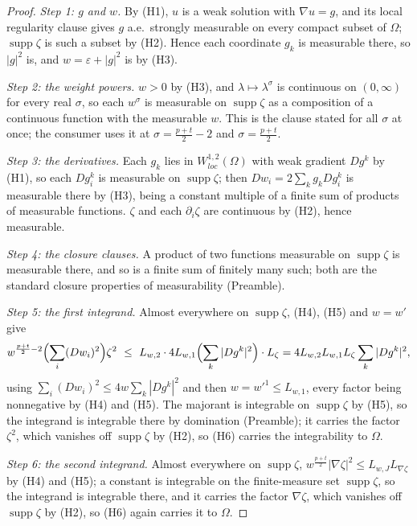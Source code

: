 \begin{proof}
\emph{Step 1: $g$ and $w$.}  By (H1), $u$ is a weak solution with $\nabla u=g$,
and its local regularity clause gives $g$ a.e.\ strongly measurable on every
compact subset of $\Omega$; $\operatorname{supp}\zeta$ is such a subset by (H2).
Hence each coordinate $g_k$ is measurable there, so $|g|^2$ is, and
$w=\varepsilon+|g|^2$ is by (H3).

\emph{Step 2: the weight powers.}  $w>0$ by (H3), and
$\lambda\mapsto\lambda^\sigma$ is continuous on $(0,\infty)$ for every real
$\sigma$, so each $w^\sigma$ is measurable on $\operatorname{supp}\zeta$ as a
composition of a continuous function with the measurable $w$.  This is the
clause stated for all $\sigma$ at once; the consumer uses it at
$\sigma=\frac{p+t}2-2$ and $\sigma=\frac{p+t}2$.

\emph{Step 3: the derivatives.}  Each $g_k$ lies in $W^{1,2}_{loc}(\Omega)$
with weak gradient $Dg^k$ by (H1), so each $Dg^k_i$ is measurable on
$\operatorname{supp}\zeta$; then $Dw_i=2\sum_kg_kDg^k_i$ is measurable there by
(H3), being a constant multiple of a finite sum of products of measurable
functions.  $\zeta$ and each $\partial_i\zeta$ are continuous by (H2), hence
measurable.

\emph{Step 4: the closure clauses.}  A product of two functions measurable on
$\operatorname{supp}\zeta$ is measurable there, and so is a finite sum of
finitely many such; both are the standard closure properties of measurability
(Preamble).

\emph{Step 5: the first integrand.}  Almost everywhere on
$\operatorname{supp}\zeta$, (H4), (H5) and $w=w'$ give
\[
w^{\frac{p+t}2-2}\Bigl(\sum_i(Dw_i)^2\Bigr)\zeta^2
\ \le\ L_{w,2}\cdot4L_{w,1}\Bigl(\sum_k|Dg^k|^2\Bigr)\cdot L_\zeta
=4L_{w,2}L_{w,1}L_\zeta\sum_k|Dg^k|^2,
\]
using $\sum_i(Dw_i)^2\le4w\sum_k|Dg^k|^2$ and then $w=w'^1\le L_{w,1}$, every
factor being nonnegative by (H4) and (H5).  The majorant is integrable on
$\operatorname{supp}\zeta$ by (H5), so the integrand is integrable there by
domination (Preamble); it carries the factor $\zeta^2$, which vanishes off
$\operatorname{supp}\zeta$ by (H2), so (H6) carries the integrability to
$\Omega$.

\emph{Step 6: the second integrand.}  Almost everywhere on
$\operatorname{supp}\zeta$, $w^{\frac{p+t}2}|\nabla\zeta|^2\le L_{w,J}L_{\nabla\zeta}$
by (H4) and (H5); a constant is integrable on the finite-measure set
$\operatorname{supp}\zeta$, so the integrand is integrable there, and it carries
the factor $\nabla\zeta$, which vanishes off $\operatorname{supp}\zeta$ by
(H2), so (H6) again carries it to $\Omega$.
\end{proof}
